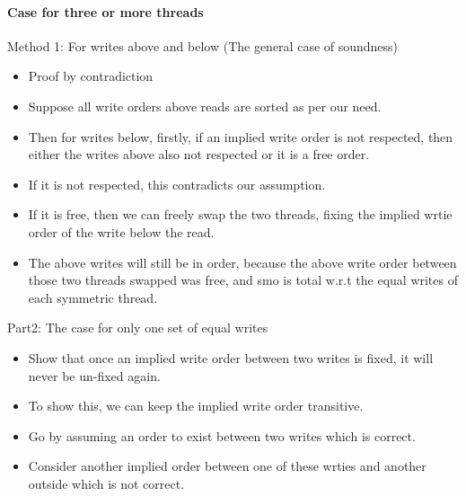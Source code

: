         

    \paragraph{Case for three or more threads}

        Method 1: For writes above and below (The general case of soundness)
        \begin{itemize}
            \item Proof by contradiction 
            \item Suppose all write orders above reads are sorted as per our need. 
            \item Then for writes below, firstly, if an implied write order is not respected, then either the writes above also not respected or it is a free order. 
            \item If it is not respected, this contradicts our assumption.
            \item If it is free, then we can freely swap the two threads, fixing the implied wrtie order of the write below the read. 
            \item The above writes will still be in order, because the above write order between those two threads swapped was free, and smo is total w.r.t the equal writes of each symmetric thread.  
        \end{itemize}

    

        Part2: The case for only one set of equal writes 
        \begin{itemize}
            \item Show that once an implied write order between two writes is fixed, it will never be un-fixed again.
            \item To show this, we can keep the implied write order transitive. 
            \item Go by assuming an order to exist between two writes which is correct. 
            \item Consider another implied order between one of these wrties and another outside which is not correct. 
        \end{itemize}